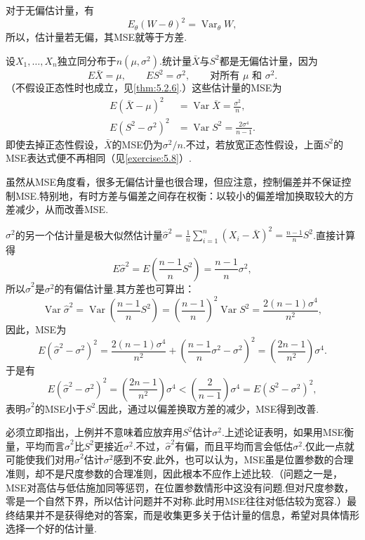 对于无偏估计量，有
$$E_\theta(W-\theta)^2=\operatorname{Var}_\theta W,$$
所以，估计量若无偏，其MSE就等于方差.
\begin{example}[正态分布的MSE]\label{ex:7.3.3}
设$X_1,\ldots,X_n$独立同分布于$n(\mu,\sigma^2)$.统计量$\bar X$与$S^2$都是无偏估计量，因为
$$E\bar X=\mu,\qquad ES^2=\sigma^2,\qquad\text{对所有 }\mu\text{ 和 }\sigma^2.$$
（不假设正态性时也成立，见\autoref{thm:5.2.6}.）这些估计量的MSE为
\begin{align*}
E(\bar X-\mu)^2&=\operatorname{Var}\bar X=\frac{\sigma^2}n,\\
E(S^2-\sigma^2)^2&=\operatorname{Var}S^2=\frac{2\sigma^4}{n-1}.
\end{align*}
即使去掉正态性假设，$\bar X$的MSE仍为$\sigma^2/n$.不过，若放宽正态性假设，上面$S^2$的MSE表达式便不再相同（见\autoref{exercise:5.8}）.
\end{example}
虽然从MSE角度看，很多无偏估计量也很合理，但应注意，控制偏差并不保证控制MSE.特别地，有时方差与偏差之间存在权衡：以较小的偏差增加换取较大的方差减少，从而改善MSE.
\begin{example}[续\autoref{ex:7.3.3}]\label{ex:7.3.4}
$\sigma^2$的另一个估计量是极大似然估计量$\widehat\sigma^2=\frac1n\sum_{i=1}^n(X_i-\bar X)^2=\frac{n-1}nS^2$.直接计算得
$$E\widehat\sigma^2=E\left(\frac{n-1}nS^2\right)=\frac{n-1}n\sigma^2,$$
所以$\widehat\sigma^2$是$\sigma^2$的有偏估计量.其方差也可算出：
$$\operatorname{Var}\widehat\sigma^2=\operatorname{Var}\left(\frac{n-1}nS^2\right)=\left(\frac{n-1}n\right)^2\operatorname{Var}S^2=\frac{2(n-1)\sigma^4}{n^2},$$
因此，MSE为
$$E(\widehat\sigma^2-\sigma^2)^2=\frac{2(n-1)\sigma^4}{n^2}+\left(\frac{n-1}n\sigma^2-\sigma^2\right)^2=\left(\frac{2n-1}{n^2}\right)\sigma^4.$$
于是有
$$E(\widehat\sigma^2-\sigma^2)^2=\left(\frac{2n-1}{n^2}\right)\sigma^4<\left(\frac2{n-1}\right)\sigma^4=E(S^2-\sigma^2)^2,$$
表明$\widehat\sigma^2$的MSE小于$S^2$.因此，通过以偏差换取方差的减少，MSE得到改善.
\end{example}
必须立即指出，上例并不意味着应放弃用$S^2$估计$\sigma^2$.上述论证表明，如果用MSE衡量，平均而言$\widehat\sigma^2$比$S^2$更接近$\sigma^2$.不过，$\widehat\sigma^2$有偏，而且平均而言会低估$\sigma^2$.仅此一点就可能使我们对用$\widehat\sigma^2$估计$\sigma^2$感到不安.此外，也可以认为，MSE虽是位置参数的合理准则，却不是尺度参数的合理准则，因此根本不应作上述比较.（问题之一是，MSE对高估与低估施加同等惩罚，在位置参数情形中这没有问题.但对尺度参数，零是一个自然下界，所以估计问题并不对称.此时用MSE往往对低估较为宽容.）最终结果并不是获得绝对的答案，而是收集更多关于估计量的信息，希望对具体情形选择一个好的估计量.
